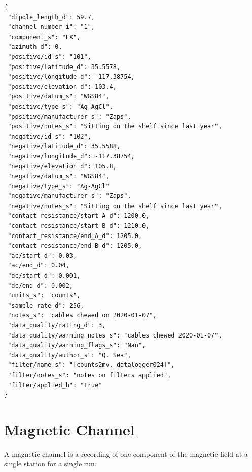 \documentclass{article}
\begin{document}
\begin{verbatim}
{
 "dipole_length_d": 59.7,
 "channel_number_i": "1",
 "component_s": "EX",
 "azimuth_d": 0,
 "positive/id_s": "101",
 "positive/latitude_d": 35.5578,
 "positive/longitude_d": -117.38754,
 "positive/elevation_d": 103.4,
 "positive/datum_s": "WGS84",
 "positive/type_s": "Ag-AgCl",
 "positive/manufacturer_s": "Zaps",
 "positive/notes_s": "Sitting on the shelf since last year",
 "negative/id_s": "102",
 "negative/latitude_d": 35.5588,
 "negative/longitude_d": -117.38754,
 "negative/elevation_d": 105.8,
 "negative/datum_s": "WGS84",
 "negative/type_s": "Ag-AgCl"
 "negative/manufacturer_s": "Zaps",
 "negative/notes_s": "Sitting on the shelf since last year",
 "contact_resistance/start_A_d": 1200.0,
 "contact_resistance/start_B_d": 1210.0,
 "contact_resistance/end_A_d": 1205.0,
 "contact_resistance/end_B_d": 1205.0,
 "ac/start_d": 0.03,
 "ac/end_d": 0.04,
 "dc/start_d": 0.001,
 "dc/end_d": 0.002,
 "units_s": "counts",
 "sample_rate_d": 256,
 "notes_s": "cables chewed on 2020-01-07",
 "data_quality/rating_d": 3,
 "data_quality/warning_notes_s": "cables chewed 2020-01-07",
 "data_quality/warning_flags_s": "Nan",
 "data_quality/author_s": "Q. Sea",
 "filter/name_s": "[counts2mv, datalogger024]",
 "filter/notes_s": "notes on filters applied",
 "filter/applied_b": "True"
}
\end{verbatim}

\newpage
\section{Magnetic Channel}

A magnetic channel is a recording of one component of the magnetic field at a single station for a single run.
\end{document}
